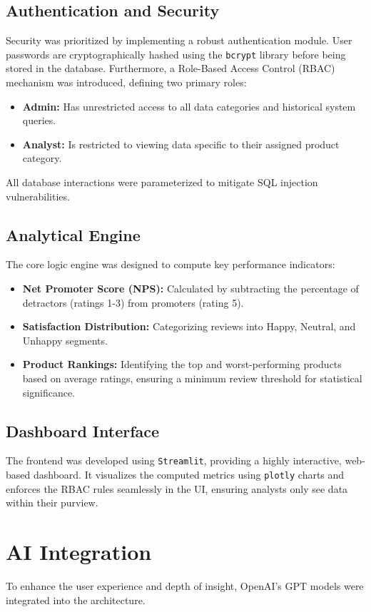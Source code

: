 \documentclass[12pt,a4paper]{article}
\begin{document}
\subsection{Authentication and Security}
Security was prioritized by implementing a robust authentication module. User passwords are cryptographically hashed using the \texttt{bcrypt} library before being stored in the database. Furthermore, a Role-Based Access Control (RBAC) mechanism was introduced, defining two primary roles:
\begin{itemize}
    \item \textbf{Admin:} Has unrestricted access to all data categories and historical system queries.
    \item \textbf{Analyst:} Is restricted to viewing data specific to their assigned product category.
\end{itemize}
All database interactions were parameterized to mitigate SQL injection vulnerabilities.

\subsection{Analytical Engine}
The core logic engine was designed to compute key performance indicators:
\begin{itemize}
    \item \textbf{Net Promoter Score (NPS):} Calculated by subtracting the percentage of detractors (ratings 1-3) from promoters (rating 5).
    \item \textbf{Satisfaction Distribution:} Categorizing reviews into Happy, Neutral, and Unhappy segments.
    \item \textbf{Product Rankings:} Identifying the top and worst-performing products based on average ratings, ensuring a minimum review threshold for statistical significance.
\end{itemize}

\subsection{Dashboard Interface}
The frontend was developed using \texttt{Streamlit}, providing a highly interactive, web-based dashboard. It visualizes the computed metrics using \texttt{plotly} charts and enforces the RBAC rules seamlessly in the UI, ensuring analysts only see data within their purview.

\section{AI Integration}
To enhance the user experience and depth of insight, OpenAI's GPT models were integrated into the architecture.
\end{document}
